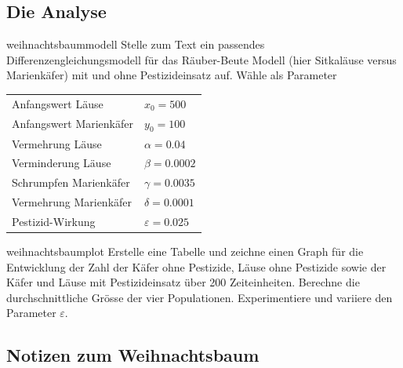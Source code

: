 \documentclass[%
<<<<<<< Updated upstream
11pt,%
twoside,%
titlepage,%
german,%
headsepline%
]{scrartcl}
\newcommand{\spaltenheight}{\rule{0mm}{3ex}}
\newcommand{\spaltensep}{\\[1ex]}
\begin{document}
\subsection{Die Analyse}
\begin{uebenv}{weihnachtsbaummodell}
    Stelle zum Text ein passendes Differenzengleichungsmodell für das Räuber-Beute Modell (hier Sitkaläuse versus Marienkäfer) mit und ohne Pestizideinsatz auf. Wähle als Parameter

\begin{center}
\begin{tabular}{ll}
\spaltenheight Anfangswert Läuse & $x_0=500$\spaltensep
\spaltenheight Anfangswert Marienkäfer\hspace*{3ex} & $y_0=100$\spaltensep
\spaltenheight Vermehrung Läuse & $\alpha=0.04$\spaltensep
\spaltenheight Verminderung Läuse & $\beta=0.0002$\spaltensep
\spaltenheight Schrumpfen Marienkäfer & $\gamma=0.0035$\spaltensep
\spaltenheight Vermehrung Marienkäfer & $\delta=0.0001$\spaltensep
\spaltenheight Pestizid-Wirkung & $\varepsilon=0.025$
\end{tabular}
\end{center}
\end{uebenv}

\begin{uebenv}{weihnachtsbaumplot}
    Erstelle eine Tabelle und zeichne einen Graph für die Entwicklung der Zahl der Käfer ohne Pestizide, Läuse ohne Pestizide sowie der Käfer und Läuse mit Pestizideinsatz über 200 Zeiteinheiten. Berechne die durchschnittliche Grösse der vier Populationen. Experimentiere und variiere den Parameter $\varepsilon$.
\end{uebenv}

\clearpage

\subsection{Notizen zum Weihnachtsbaum}
\end{document}
